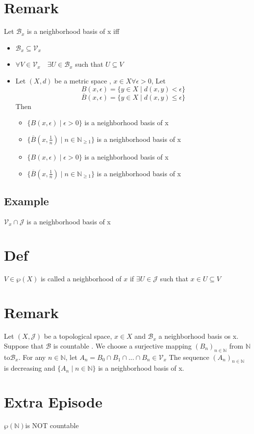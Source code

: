 \documentclass{book}
\begin{document}
\section{Remark}
Let $\mathscr{B}_x$ is a neighborhood basis of x iff\begin{itemize}
    \item $\mathscr{B}_x\subseteq\mathcal{V}_x$
    \item $\forall V\in \mathcal{V}_x\quad \exists U\in \mathscr{B}_x$ such that $U\subseteq V$
    \item Let $(X,d)$ be a metric space , $x\in X$$\forall \epsilon>0$, Let $$B(x,\epsilon)=\{y\in X\mid d(x,y)<\epsilon\}$$$$\overline{B}(x,\epsilon)=\{y\in X\mid d(x,y)\leq\epsilon\}$$Then \begin{itemize}
    \item $\{B(x,\epsilon)\mid \epsilon>0\}$ is a neighborhood basis of x
    \item $\{\overline{B}(x,\frac{1}{n})\mid n\in \mathbb{N}_{\geq 1}\}$ is a neighborhood basis of x
    \item $\{B(x,\epsilon)\mid \epsilon>0\}$ is a neighborhood basis of x
    \item $\{\overline{B}(x,\frac{1}{n})\mid n\in \mathbb{N}_{\geq 1}\}$ is a neighborhood basis of x
    \end{itemize}
\end{itemize}
\subsection{Example}$\mathcal{V}_x\cap\mathcal{J}$ is a neighborhood basis of x
\section{Def}
$V\in \wp(X)$ is called a neighborhood of $x$ if $\exists U\in \mathcal{J}$ such that $ x\in U\subseteq V$
\section{Remark}
Let $(X,\mathcal{J})$ be a topological space, $x\in X$ and $\mathscr{B}_x$ a neighborhood basis os x. Suppose that $\mathscr{B}$ is countable . We choose a surjective mapping $(B_n)_{n\in \mathbb{N} }$ from $\mathbb{N} $ to$\mathscr{B}_x$. For any $n\in \mathbb{N} $, let $A_n=B_0\cap B_1\cap...\cap B_n\in\mathcal{V}_x$ The sequence $(A_n)_{n\in \mathbb{N} }$ is decreasing and $\{A_n\mid n\in\mathbb{N} \}$ is a neighborhood basis of x.
\section{Extra Episode}$\wp(\mathbb{N} )$is NOT countable
\end{document}
